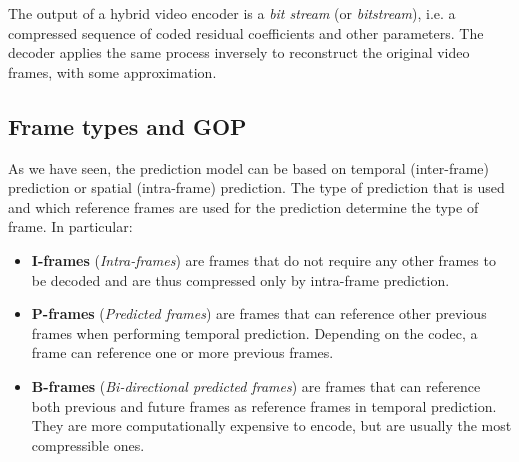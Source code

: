 

The output of a hybrid video encoder is a \textit{bit stream} (or \textit{bitstream}), i.e. a compressed sequence of coded residual coefficients and other parameters. The decoder applies the same process inversely to reconstruct the original video frames, with some approximation.

\subsection{Frame types and GOP}
\label{sec:bg/compression/gop}

As we have seen, the prediction model can be based on temporal (inter-frame) prediction or spatial (intra-frame) prediction. The type of prediction that is used and which reference frames are used for the prediction determine the type of frame. In particular:

\begin{itemize}
    \item \textbf{I-frames} (\textit{Intra-frames}) are frames that do not require any other frames to be decoded and are thus compressed only by intra-frame prediction.
    \item \textbf{P-frames} (\textit{Predicted frames}) are frames that can reference other previous frames when performing temporal prediction. Depending on the codec, a frame can reference one or more previous frames.
    \item \textbf{B-frames} (\textit{Bi-directional predicted frames}) are frames that can reference both previous and future frames as reference frames in temporal prediction. They are more computationally expensive to encode, but are usually the most compressible ones.
\end{itemize}


